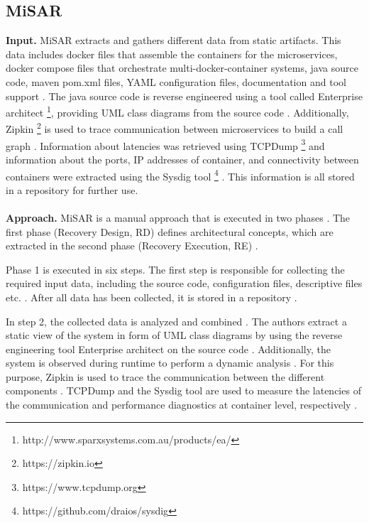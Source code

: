\subsection{MiSAR}
\label{sec:Results:MiSAR}
\textbf{Input.}
MiSAR extracts and gathers different data from static artifacts.
This data includes docker files that assemble the containers for the microservices, docker compose files that orchestrate multi-docker-container systems, java source code, maven pom.xml files, YAML configuration files, documentation and tool support \cite{Alshuqayran2018MiSAR}.
The java source code is reverse engineered using a tool called Enterprise architect \footnote{http://www.sparxsystems.com.au/products/ea/}, providing UML class diagrams from the source code \cite{Alshuqayran2018MiSAR}.
Additionally, Zipkin \footnote{https://zipkin.io} is used to trace communication between microservices to build a call graph \cite{Alshuqayran2018MiSAR}.
Information about latencies was retrieved using TCPDump \footnote{https://www.tcpdump.org} and information about the ports, IP addresses of container, and connectivity between containers were extracted using the Sysdig tool \footnote{https://github.com/draios/sysdig} \cite{Alshuqayran2018MiSAR}.
This information is all stored in a repository for further use.
\\ \\
\textbf{Approach.}
MiSAR is a manual approach that is executed in two phases \cite{Alshuqayran2018MiSAR}.
The first phase (Recovery Design, RD) defines architectural concepts, which are extracted in the second phase (Recovery Execution, RE) \cite{Alshuqayran2018MiSAR}.

Phase 1 is executed in six steps.
The first step is responsible for collecting the required input data, including the source code, configuration files, descriptive files etc. \cite{Alshuqayran2018MiSAR}.
After all data has been collected, it is stored in a repository \cite{Alshuqayran2018MiSAR}.

In step 2, the collected data is analyzed and combined \cite{Alshuqayran2018MiSAR}.
The authors extract a static view of the system in form of UML class diagrams by using the reverse engineering tool Enterprise architect on the source code \cite{Alshuqayran2018MiSAR}.
Additionally, the system is observed during runtime to perform a dynamic analysis \cite{Alshuqayran2018MiSAR}.
For this purpose, Zipkin is used to trace the communication between the different components \cite{Alshuqayran2018MiSAR}.
TCPDump and the Sysdig tool are used to measure the latencies of the communication and performance diagnostics at container level, respectively \cite{Alshuqayran2018MiSAR}.

